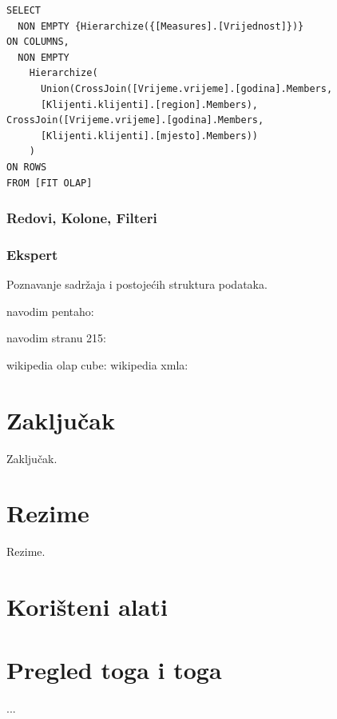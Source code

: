 \documentclass[times, utf8, seminar]{fit}
\begin{document}
\begin{lstlisting}
SELECT
  NON EMPTY {Hierarchize({[Measures].[Vrijednost]})} 
ON COLUMNS,
  NON EMPTY 
    Hierarchize(
      Union(CrossJoin([Vrijeme.vrijeme].[godina].Members, 
      [Klijenti.klijenti].[region].Members), CrossJoin([Vrijeme.vrijeme].[godina].Members, 
      [Klijenti.klijenti].[mjesto].Members))
    ) 
ON ROWS
FROM [FIT OLAP]
\end{lstlisting}



\subsection{Redovi, Kolone, Filteri}





\subsection{Ekspert}

Poznavanje sadržaja i postojećih struktura podataka.





navodim pentaho: \cite{pentaho32}

navodim stranu 215: \cite[str.~215]{pentaho32}

wikipedia olap cube: \cite{web:wikipedia:olap_cube}
wikipedia xmla: \cite{web:wikipedia:xmla}

\chapter{Zaključak}
Zaključak.




\chapter{Rezime}
Rezime.

\appendix

\chapter{Korišteni alati}

\chapter{Pregled toga i toga}

...
\end{document}
